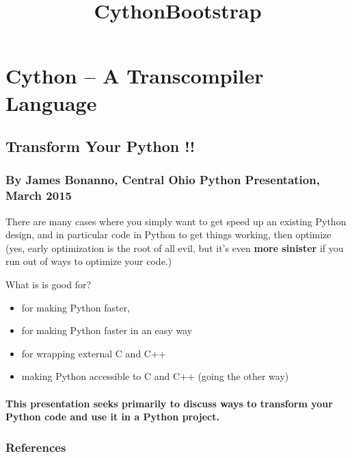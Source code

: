 \documentclass{article}
\title{CythonBootstrap}
\begin{document}
    
    
    \maketitle
    
    

    
    \section{Cython -- A Transcompiler
Language}\label{cython-a-transcompiler-language}

\subsection{Transform Your Python !!}\label{transform-your-python}

\subsubsection{By James Bonanno, Central Ohio Python Presentation, March
2015}\label{by-james-bonanno-central-ohio-python-presentation-march-2015}

There are many cases where you simply want to get speed up an existing
Python design, and in particular code in Python to get things working,
then optimize (yes, early optimization is the root of all evil, but it's
even \textbf{more sinister} if you run out of ways to optimize your
code.)

What is is good for?

\begin{itemize}
\itemsep1pt\parskip0pt
\item
  for making Python faster,
\item
  for making Python faster in an easy way
\item
  for wrapping external C and C++
\item
  making Python accessible to C and C++ (going the other way)
\end{itemize}

\paragraph{This presentation seeks primarily to discuss ways to
transform your Python code and use it in a Python
project.}\label{this-presentation-seeks-primarily-to-discuss-ways-to-transform-your-python-code-and-use-it-in-a-python-project.}

    \subsubsection{References}\label{references}
\end{document}
